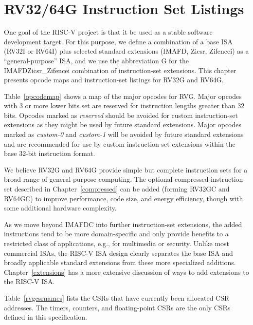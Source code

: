 \chapter{RV32/64G Instruction Set Listings}

One goal of the RISC-V project is that it be used as a stable software
development target.  For this purpose, we define a combination of a
base ISA (RV32I or RV64I) plus selected standard extensions (IMAFD, Zicsr, Zifencei) as
a ``general-purpose'' ISA, and we use the abbreviation G for the IMAFDZicsr\_Zifencei
combination of instruction-set extensions.    This chapter presents
opcode maps and instruction-set listings for RV32G and RV64G.



Table~\ref{opcodemap} shows a map of the major opcodes for RVG.  Major
opcodes with 3 or more lower bits set are reserved for instruction
lengths greater than 32 bits.  Opcodes marked as {\em reserved} should
be avoided for custom instruction-set extensions as they might be used
by future standard extensions.  Major opcodes marked as {\em custom-0}
and {\em custom-1} will be avoided by future standard extensions and
are recommended for use by custom instruction-set extensions within
the base 32-bit instruction format.

We believe RV32G and RV64G provide simple but complete instruction
sets for a broad range of general-purpose computing.  The optional
compressed instruction set described in Chapter~\ref{compressed} can
be added (forming RV32GC and RV64GC) to improve performance, code
size, and energy efficiency, though with some additional hardware
complexity.

As we move beyond IMAFDC into further instruction-set extensions, the
added instructions tend to be more domain-specific and only provide
benefits to a restricted class of applications, e.g., for multimedia
or security.  Unlike most commercial ISAs, the RISC-V ISA design
clearly separates the base ISA and broadly applicable standard
extensions from these more specialized additions.
Chapter~\ref{extensions} has a more extensive discussion of ways to
add extensions to the RISC-V ISA.



\FloatBarrier
Table~\ref{rvgcsrnames} lists the CSRs that have
currently been allocated CSR addresses.  The timers, counters, and
floating-point CSRs are the only CSRs defined in this specification.

